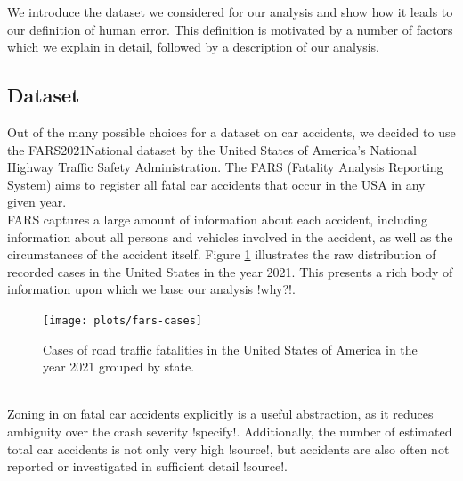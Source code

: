\documentclass{article}
\theoremstyle{plain}
\theoremstyle{definition}
\theoremstyle{remark}
\begin{document}
We introduce the dataset we considered for our analysis and show how it leads to our definition of human error. This definition is motivated by a number of factors which we explain in detail, followed by a description of our analysis.






\subsection{Dataset}
Out of the many possible choices for a dataset on car accidents, we decided to use the FARS2021National dataset by the United States of America's National Highway Traffic Safety Administration. The FARS (Fatality Analysis Reporting System) aims to register all fatal car accidents that occur in the USA in any given year.
\\
FARS captures a large amount of information about each accident, including information about all persons and vehicles involved in the accident, as well as the circumstances of the accident itself. Figure \ref{fig:fars-cases} illustrates the raw distribution of recorded cases in the United States in the year 2021. This presents a rich body of information upon which we base our analysis !why?!.
\begin{figure}[ht]
	\vskip 0.2in
	\begin{center}
		\texttt{[image: plots/fars-cases]}
		\caption{Cases of road traffic fatalities in the United States of America in the year 2021 grouped by state.}
		\label{fig:fars-cases}
	\end{center}
	\vskip -0.2in
\end{figure}
\\
Zoning in on fatal car accidents explicitly is a useful abstraction, as it reduces ambiguity over the crash severity !specify!. Additionally, the number of estimated total car accidents is not only very high !source!, but accidents are also often not reported or investigated in sufficient detail !source!.
\end{document}
